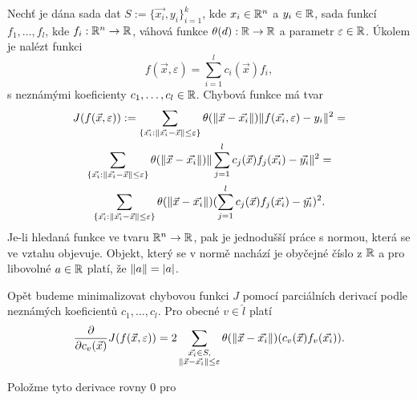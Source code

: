 Nechť je dána sada dat $S := \{\vec{x_i}, y_i\}_{i = 1}^k$, kde $x_i \in \mathbb{R}^n$ a $y_i \in \mathbb{R}$, sada funkcí $f_1,\ldots,f_l$, kde $f_i: \mathbb{R}^n \rightarrow \mathbb{R}$, váhová funkce $\theta(d): \mathbb{R} \rightarrow \mathbb{R}$ a parametr $\varepsilon \in \mathbb{R}$. Úkolem je nalézt funkci
\begin{equation}
  \label{defi:mwls-1d}
  f(\vec{x},\varepsilon) = \sum_{i=1}^lc_i(\vec{x})f_i,
\end{equation}
s neznámými koeficienty $c_1, \ldots, c_l \in \mathbb{R}$. Chybová funkce má tvar
\begin{multline}
  \label{defi:mwls-min-1d}
  J(f(\vec{x},\varepsilon)) :=
  \sum_{\{\vec{x_i} : \|\vec{x_i} - \vec{x}\| \leq \varepsilon\}} \theta(\|\vec{x} - \vec{x_i}\|)\|f(\vec{x_i}, \varepsilon) - y_i\|^2 =\\
  \sum_{\{\vec{x_i} : \|\vec{x_i} - \vec{x}\| \leq \varepsilon\}} \theta(\|\vec{x} - \vec{x_i}\|)\|\sum_{j=1}^l c_j(\vec{x})f_j(\vec{x_i}) - \vec{y_i}\|^2 =\\
  \sum_{\{\vec{x_i} : \|\vec{x_i} - \vec{x}\| \leq \varepsilon\}} \theta(\|\vec{x} - \vec{x_i}\|)(\sum_{j=1}^l c_j(\vec{x})f_j(\vec{x_i}) - \vec{y_i})^2.\\
\end{multline}
Je-li hledaná funkce ve tvaru $\mathbb{R}^n \rightarrow \mathbb{R}$, pak je jednodušší práce s normou, která se ve vztahu objevuje. Objekt, který se v normě nachází je obyčejné číslo z $\mathbb{R}$ a pro libovolné $a \in \mathbb{R}$ platí, že $\|a\| = |a|$.

Opět budeme minimalizovat chybovou funkci $J$ pomocí parciálních derivací podle neznámých koeficientů $c_1, \ldots, c_l$. Pro obecné $v \in \hat l$ platí
\begin{equation}
  \label{eq:1d-mwls-diff}
  \frac{\partial}{\partial c_v(\vec{x})}J(f(\vec{x}, \varepsilon)) =
  2\sum_{\substack{\vec{x_i} \in S,\\\|\vec{x} - \vec{x_i}\| \leq \varepsilon}} \theta(\|\vec{x} - \vec{x_i}\|)(c_v(\vec{x})f_v(\vec{x_i})).\\
\end{equation}

Položme tyto derivace rovny $0$ pro

